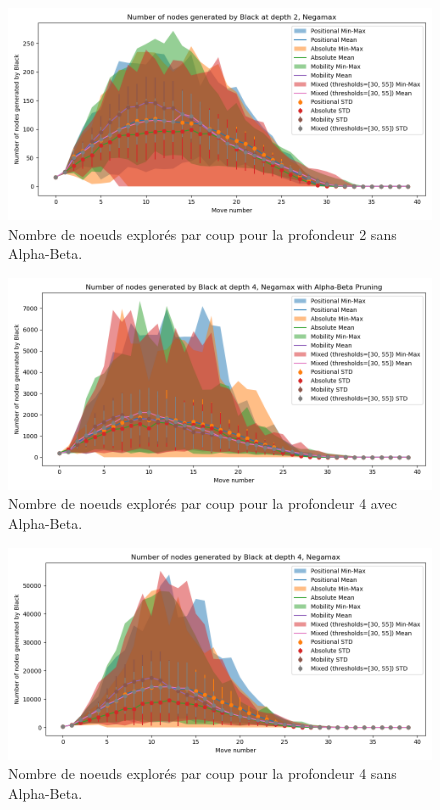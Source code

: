 \begin{figure}[H]
    \centering
    \includegraphics[width=1\textwidth]{ressources/Number of nodes generated by Black_depth_2_Negamax.png}
    \caption{Nombre de noeuds explorés par coup pour la profondeur 2 sans Alpha-Beta.}
    \label{fig:node_explored_negamax}
\end{figure}

\begin{figure}[H]
    \centering
    \includegraphics[width=1\textwidth]{ressources/Number of nodes generated by Black_depth_4_Negamax with Alpha-Beta Pruning.png}
    \caption{Nombre de noeuds explorés par coup pour la profondeur 4 avec Alpha-Beta.}
    \label{fig:node_explored_alpha_beta_4}
\end{figure}

\begin{figure}[H]
    \centering
    \includegraphics[width=1\textwidth]{ressources/Number of nodes generated by Black_depth_4_Negamax.png}
    \caption{Nombre de noeuds explorés par coup pour la profondeur 4 sans Alpha-Beta.}
    \label{fig:node_explored_negamax_4}
\end{figure}

